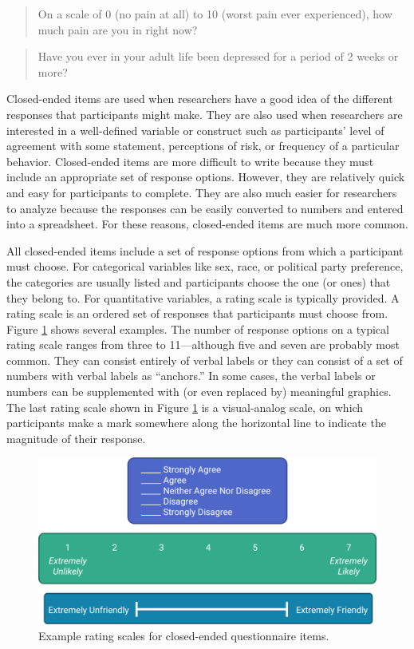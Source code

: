 \documentclass[
]{krantz}
\begin{document}
\begin{quote}
On a scale of 0 (no pain at all) to 10 (worst pain ever experienced), how much pain are you in right now?
\end{quote}

\begin{quote}
Have you ever in your adult life been depressed for a period of 2 weeks or more?
\end{quote}

Closed-ended items are used when researchers have a good idea of the different responses that participants might make. They are also used when researchers are interested in a well-defined variable or construct such as participants' level of agreement with some statement, perceptions of risk, or frequency of a particular behavior. Closed-ended items are more difficult to write because they must include an appropriate set of response options. However, they are relatively quick and easy for participants to complete. They are also much easier for researchers to analyze because the responses can be easily converted to numbers and entered into a spreadsheet. For these reasons, closed-ended items are much more common.

All closed-ended items include a set of response options from which a participant must choose. For categorical variables like sex, race, or political party preference, the categories are usually listed and participants choose the one (or ones) that they belong to. For quantitative variables, a rating scale is typically provided. A rating scale is an ordered set of responses that participants must choose from. Figure \ref{fig:scales} shows several examples. The number of response options on a typical rating scale ranges from three to 11---although five and seven are probably most common. They can consist entirely of verbal labels or they can consist of a set of numbers with verbal labels as ``anchors.'' In some cases, the verbal labels or numbers can be supplemented with (or even replaced by) meaningful graphics. The last rating scale shown in Figure \ref{fig:scales} is a visual-analog scale, on which participants make a mark somewhere along the horizontal line to indicate the magnitude of their response.

\begin{figure}

{\centering \includegraphics[width=0.75\linewidth]{images/nonexperiments/scales} 

}

\caption{Example rating scales for closed-ended questionnaire items.}\label{fig:scales}
\end{figure}
\end{document}
